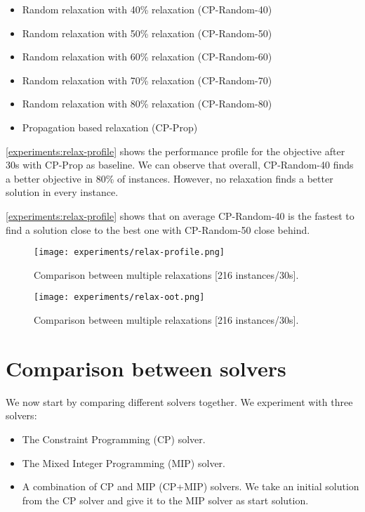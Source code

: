 \documentclass[../../thesis.tex]{subfiles}
\begin{document}
\begin{itemize}
  \item Random relaxation with 40\% relaxation (CP-Random-40)
  \item Random relaxation with 50\% relaxation (CP-Random-50)
  \item Random relaxation with 60\% relaxation (CP-Random-60)
  \item Random relaxation with 70\% relaxation (CP-Random-70)
  \item Random relaxation with 80\% relaxation (CP-Random-80)
  \item Propagation based relaxation (CP-Prop)
\end{itemize}


\autoref{experiments:relax-profile} shows the performance profile for the objective after 30s with 
CP-Prop as baseline.
We can observe that overall, CP-Random-40 finds a better objective in 80\% of instances. However,
no relaxation finds a better solution in every instance. 


\autoref{experiments:relax-profile} shows that on average CP-Random-40 is the fastest to find a solution close 
to the best one with CP-Random-50 close behind.

\begin{figure}
  \centering
  \texttt{[image: experiments/relax-profile.png]}
  \caption{Comparison between multiple relaxations [216 instances/30s].}
  \label{experiments:relax-profile}
\end{figure}

\begin{figure}
  \centering
  \texttt{[image: experiments/relax-oot.png]}
  \caption{Comparison between multiple relaxations [216 instances/30s].}
  \label{experiments:relax-oot}
\end{figure}




\section{Comparison between solvers}

We now start by comparing different solvers together. We experiment with three solvers: 

\begin{itemize}
  \item The Constraint Programming (CP) solver.
  \item The Mixed Integer Programming (MIP) solver.
  \item A combination of CP and MIP (CP+MIP) solvers. We take an initial solution from the CP solver 
  and give it to the MIP solver as start solution. 
\end{itemize}
\end{document}
